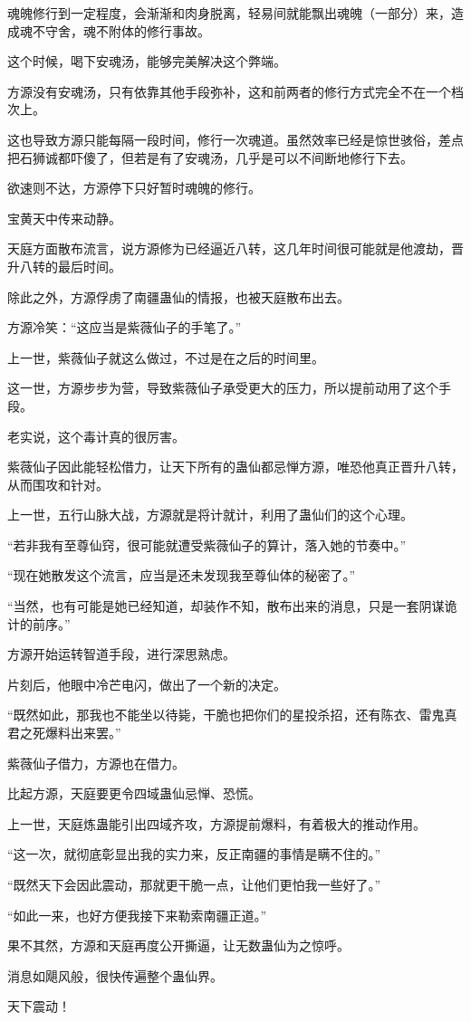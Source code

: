 \begin{this_body}
魂魄修行到一定程度，会渐渐和肉身脱离，轻易间就能飘出魂魄（一部分）来，造成魂不守舍，魂不附体的修行事故。

这个时候，喝下安魂汤，能够完美解决这个弊端。

方源没有安魂汤，只有依靠其他手段弥补，这和前两者的修行方式完全不在一个档次上。

这也导致方源只能每隔一段时间，修行一次魂道。虽然效率已经是惊世骇俗，差点把石狮诚都吓傻了，但若是有了安魂汤，几乎是可以不间断地修行下去。

欲速则不达，方源停下只好暂时魂魄的修行。

宝黄天中传来动静。

天庭方面散布流言，说方源修为已经逼近八转，这几年时间很可能就是他渡劫，晋升八转的最后时间。

除此之外，方源俘虏了南疆蛊仙的情报，也被天庭散布出去。

方源冷笑：“这应当是紫薇仙子的手笔了。”

上一世，紫薇仙子就这么做过，不过是在之后的时间里。

这一世，方源步步为营，导致紫薇仙子承受更大的压力，所以提前动用了这个手段。

老实说，这个毒计真的很厉害。

紫薇仙子因此能轻松借力，让天下所有的蛊仙都忌惮方源，唯恐他真正晋升八转，从而围攻和针对。

上一世，五行山脉大战，方源就是将计就计，利用了蛊仙们的这个心理。

“若非我有至尊仙窍，很可能就遭受紫薇仙子的算计，落入她的节奏中。”

“现在她散发这个流言，应当是还未发现我至尊仙体的秘密了。”

“当然，也有可能是她已经知道，却装作不知，散布出来的消息，只是一套阴谋诡计的前序。”

方源开始运转智道手段，进行深思熟虑。

片刻后，他眼中冷芒电闪，做出了一个新的决定。

“既然如此，那我也不能坐以待毙，干脆也把你们的星投杀招，还有陈衣、雷鬼真君之死爆料出来罢。”

紫薇仙子借力，方源也在借力。

比起方源，天庭要更令四域蛊仙忌惮、恐慌。

上一世，天庭炼蛊能引出四域齐攻，方源提前爆料，有着极大的推动作用。

“这一次，就彻底彰显出我的实力来，反正南疆的事情是瞒不住的。”

“既然天下会因此震动，那就更干脆一点，让他们更怕我一些好了。”

“如此一来，也好方便我接下来勒索南疆正道。”

果不其然，方源和天庭再度公开撕逼，让无数蛊仙为之惊呼。

消息如飓风般，很快传遍整个蛊仙界。

天下震动！

\end{this_body}

